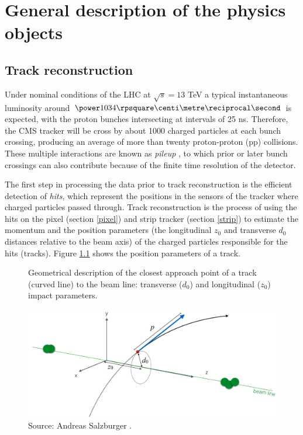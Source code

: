 \chapter{General description of the physics objects}

\section{Track reconstruction}

Under nominal conditions of the LHC at $\sqrt{s}=13$ TeV a typical instantaneous luminosity around $\designlumi$ is expected, with the proton bunches intersecting at intervals of 25 ns. Therefore, the CMS tracker will be cross by about 1000 charged particles at each bunch crossing, producing an average of more than twenty proton-proton (pp) collisions. These multiple interactions are known as \emph{pileup} \cite{1742-6596-404-1-012045}, to which prior or later bunch crossings can also contribute because of the finite time resolution of the detector.

The first step in processing the data prior to track reconstruction is the efficient detection of \emph{hits},
which represent the positions in the sensors of the tracker where charged particles passed through.
Track reconstruction is the process of using the hits on the pixel (section \ref{pixel}) and strip tracker (section \ref{strip}) to estimate the momentum and the position parameters (the longitudinal $z_{0}$ and transverse $d_{0}$ distances relative to the beam axis) of the charged particles responsible for the hits (tracks). Figure \ref{fig:tracks_par} shows the position parameters of a track.

\begin{figure}[H]
  \caption{
 Geometrical description of the closest approach point of a track (curved line) to the beam line:  transverse ($d_{0}$) and longitudinal ($z_{0}$) impact parameters.
    \label{fig:tracks_par}}
  \centering
\includegraphics[width=15cm]{Chapter3_plots/trackpar.pdf}
\caption*{Source: Andreas Salzburger \cite{Bortolleto}.}
\end{figure}

